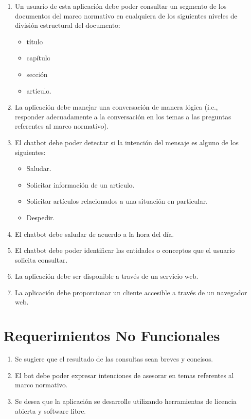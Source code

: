 \begin{enumerate}[leftmargin=2.5cm ,label={\bfseries RF-\arabic*}]
    \item \label{itm:consultar-reglamento} Un usuario de esta aplicación debe poder consultar un segmento de los documentos del marco normativo en cualquiera de los siguientes niveles de división estructural del documento:
    \begin{itemize}
        \item título
        \item capítulo
        \item sección
        \item artículo.
    \end{itemize}
    
    \item La aplicación debe manejar una conversación de manera lógica (i.e., responder adecuadamente a la conversación en los temas a las preguntas referentes al marco normativo).
    \item \label{itm:requisito-intenciones} El chatbot debe poder detectar si la intención del mensaje es alguno de los siguientes:
        \begin{itemize}
            \item Saludar.
            \item Solicitar información de un articulo.
            \item Solicitar artículos relacionados a una situación en particular.
            \item Despedir.
        \end{itemize}
    \item El chatbot debe saludar de acuerdo a la hora del día.
    \item El chatbot debe poder identificar las entidades o conceptos que el usuario solicita consultar.
    \item \label{itm:rf-servicio-web} La aplicación debe ser disponible a través de un servicio web.
    \item  \label{itm:cliente-web} La aplicación debe proporcionar un cliente accesible a través de un navegador web.
\end{enumerate}

\section{Requerimientos No Funcionales}

\begin{enumerate}[leftmargin=2.5cm ,label={\bfseries RNF-\arabic*}]
    \item Se sugiere que el resultado de las consultas sean breves y concisos. 
    \item El bot debe poder expresar intenciones de asesorar en temas referentes al marco normativo.
    \item Se desea que la aplicación se desarrolle utilizando herramientas de licencia abierta y software libre.
\end{enumerate}



